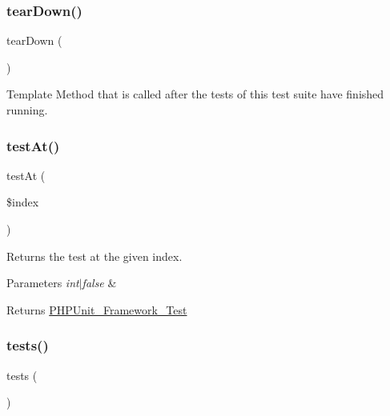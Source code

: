 \subsubsection{\texorpdfstring{tear\+Down()}{tearDown()}}
{\footnotesize\ttfamily tear\+Down (\begin{DoxyParamCaption}{ }\end{DoxyParamCaption})\hspace{0.3cm}{\ttfamily [protected]}}

Template Method that is called after the tests of this test suite have finished running. \mbox{\label{class_p_h_p_unit___framework___test_suite_a3dbe00f62c56c9a1d37021fcec078bc2}} 
\subsubsection{\texorpdfstring{test\+At()}{testAt()}}
{\footnotesize\ttfamily test\+At (\begin{DoxyParamCaption}\item[{}]{\$index }\end{DoxyParamCaption})}

Returns the test at the given index.


\begin{DoxyParams}{Parameters}
{\em int$\vert$false} & \\
\hline
\end{DoxyParams}
\begin{DoxyReturn}{Returns}
\mbox{\hyperlink{interface_p_h_p_unit___framework___test}{P\+H\+P\+Unit\+\_\+\+Framework\+\_\+\+Test}} 
\end{DoxyReturn}
\mbox{\label{class_p_h_p_unit___framework___test_suite_a4f7cb59970abda717113cc0e51d0b71b}} 
\subsubsection{\texorpdfstring{tests()}{tests()}}
{\footnotesize\ttfamily tests (\begin{DoxyParamCaption}{ }\end{DoxyParamCaption})}

